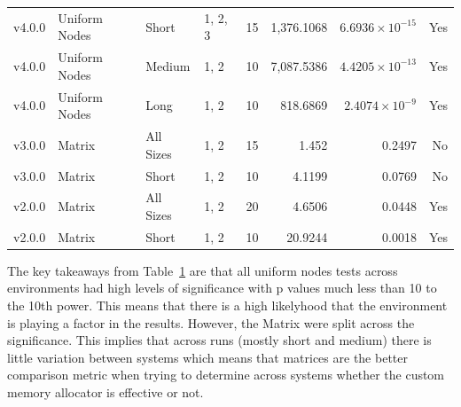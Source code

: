 \begin{table}[H]
\begin{tabular}{@{}llllcrrr@{}}
v4.0.0 & Uniform Nodes & Short & 1, 2, 3 & 15 & 1,376.1068 & $6.6936\times10^{-15}$ & Yes \\
v4.0.0 & Uniform Nodes & Medium & 1, 2 & 10 & 7,087.5386 & $4.4205\times10^{-13}$ & Yes \\
v4.0.0 & Uniform Nodes & Long & 1, 2 & 10 & 818.6869 & $2.4074\times10^{-9}$ & Yes \\
v3.0.0 & Matrix & All Sizes & 1, 2 & 15 & 1.452 & 0.2497 & No \\
v3.0.0 & Matrix & Short & 1, 2 & 10 & 4.1199 & 0.0769 & No \\
v2.0.0 & Matrix & All Sizes & 1, 2 & 20 & 4.6506 & 0.0448 & Yes \\
v2.0.0 & Matrix & Short & 1, 2 & 10 & 20.9244 & 0.0018 & Yes \\
\bottomrule\end{tabular}
\label{EnvAnova}
\end{table}

The key takeaways from Table~\ref{EnvAnova} are that all uniform nodes tests across environments had high levels of significance with p values much less than 10 to the 10th power. This means that there is a high likelyhood that the environment is playing a factor in the results.
However, the Matrix were split across the significance. This implies that across runs (mostly short and medium) there is little variation between systems which means that matrices are the better comparison metric when trying to determine across systems whether the custom memory allocator is effective or not.